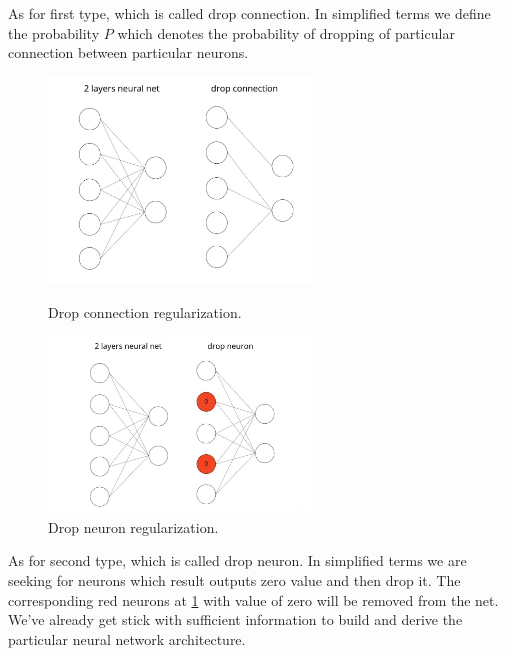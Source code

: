 As for first type, which is called drop connection. In simplified terms we define the probability $P$ which denotes the probability of dropping of particular connection between particular neurons.  

\begin{figure}[H]
\centering
\begin{minipage}{.48\linewidth}
    \includegraphics[width=7cm]{images/drop_connection.jpg}
    \caption {Drop connection regularization.}
    \label{fig:drop_connection}
\end{minipage}
\hfill
\begin{minipage}{.48\linewidth}
    \includegraphics[width=7cm]{images/drop_neuron.jpg}
    \caption {Drop neuron regularization.}
    \label{fig:drop_neuron}
\end{minipage}
\end{figure}

As for second type, which is called drop neuron. In simplified terms we are seeking for neurons which result outputs zero value and then drop it. The corresponding red neurons at \ref{fig:drop_neuron} with value of zero will be removed from the net. We've already get stick with sufficient information to build and derive the particular neural network architecture. 

